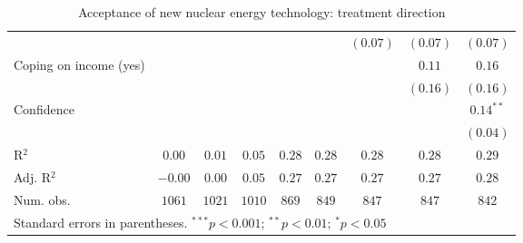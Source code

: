 \begin{table}[h]
\begin{center}
\begin{tabular}{l c c c c c c c c}
                                                                                &              &              &              &               &               & $(0.07)$      & $(0.07)$      & $(0.07)$      \\
Coping on income (yes)                                                          &              &              &              &               &               &               & $0.11$        & $0.16$        \\
                                                                                &              &              &              &               &               &               & $(0.16)$      & $(0.16)$      \\
Confidence                                                                      &              &              &              &               &               &               &               & $0.14^{**}$   \\
                                                                                &              &              &              &               &               &               &               & $(0.04)$      \\
\hline
R$^2$                                                                           & $0.00$       & $0.01$       & $0.05$       & $0.28$        & $0.28$        & $0.28$        & $0.28$        & $0.29$        \\
Adj. R$^2$                                                                      & $-0.00$      & $0.00$       & $0.05$       & $0.27$        & $0.27$        & $0.27$        & $0.27$        & $0.28$        \\
Num. obs.                                                                       & $1061$       & $1021$       & $1010$       & $869$         & $849$         & $847$         & $847$         & $842$         \\
\hline
\multicolumn{9}{l}{\scriptsize{Standard errors in parentheses. $^{***}p<0.001$; $^{**}p<0.01$; $^{*}p<0.05$}}
\end{tabular}
\caption{Acceptance of new nuclear energy technology: treatment direction}
\label{table:acceptance_new_nucs_treatment_direction}
\end{center}
\end{table}
